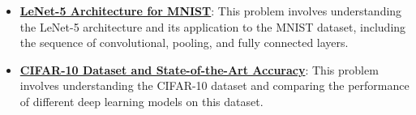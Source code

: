 \documentclass{article}%
\begin{document}
\begin{itemize}[leftmargin=*]
\item \href{https://purdue.brightspace.com/d2l/common/assets/pdfjs-d2l-dist/1.0.14-legacy/web/viewer.html?file=\%2Fcontent\%2Fenforced\%2F1095467-wl.202510.CS.24300.001\%2F09L1-cnn.pdf\%3Fou\%3D1095467\&lang=en-us\&container=d2l-fileviewer-rendered-pdf\&fullscreen=d2l-fileviewer-rendered-pdf-dialog\&height=667#page=22}{\textbf{LeNet-5 Architecture for MNIST}}: This problem involves understanding the LeNet-5 architecture and its application to the MNIST dataset, including the sequence of convolutional, pooling, and fully connected layers.%
\item \href{https://purdue.brightspace.com/d2l/common/assets/pdfjs-d2l-dist/1.0.14-legacy/web/viewer.html?file=\%2Fcontent\%2Fenforced\%2F1095467-wl.202510.CS.24300.001\%2F09L1-cnn.pdf\%3Fou\%3D1095467\&lang=en-us\&container=d2l-fileviewer-rendered-pdf\&fullscreen=d2l-fileviewer-rendered-pdf-dialog\&height=667#page=23}{\textbf{CIFAR-10 Dataset and State-of-the-Art Accuracy}}: This problem involves understanding the CIFAR-10 dataset and comparing the performance of different deep learning models on this dataset.%
\end{itemize}

%
\end{document}
